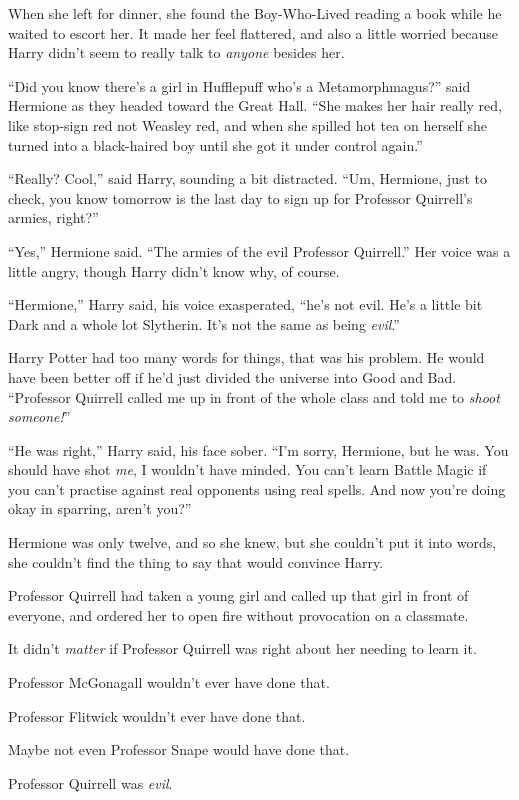 When she left for dinner, she found the Boy-Who-Lived reading a book while he waited to escort her. It made her feel flattered, and also a little worried because Harry didn’t seem to really talk to \emph{anyone} besides her.

“Did you know there’s a girl in Hufflepuff who’s a Metamorphmagus?” said Hermione as they headed toward the Great Hall. “She makes her hair really red, like stop-sign red not Weasley red, and when she spilled hot tea on herself she turned into a black-haired boy until she got it under control again.”

“Really? Cool,” said Harry, sounding a bit distracted. “Um, Hermione, just to check, you know tomorrow is the last day to sign up for Professor Quirrell’s armies, right?”

“Yes,” Hermione said. “The armies of the evil Professor Quirrell.” Her voice was a little angry, though Harry didn’t know why, of course.

“Hermione,” Harry said, his voice exasperated, “he’s not evil. He’s a little bit Dark and a whole lot Slytherin. It’s not the same as being \emph{evil}.”

Harry Potter had too many words for things, that was his problem. He would have been better off if he’d just divided the universe into Good and Bad. “Professor Quirrell called me up in front of the whole class and told me to \emph{shoot someone!}”

“He was right,” Harry said, his face sober. “I’m sorry, Hermione, but he was. You should have shot \emph{me}, I wouldn’t have minded. You can’t learn Battle Magic if you can’t practise against real opponents using real spells. And now you’re doing okay in sparring, aren’t you?”

Hermione was only twelve, and so she knew, but she couldn’t put it into words, she couldn’t find the thing to say that would convince Harry.

Professor Quirrell had taken a young girl and called up that girl in front of everyone, and ordered her to open fire without provocation on a classmate.

It didn’t \emph{matter} if Professor Quirrell was right about her needing to learn it.

Professor McGonagall wouldn’t ever have done that.

Professor Flitwick wouldn’t ever have done that.

Maybe not even Professor Snape would have done that.

Professor Quirrell was \emph{evil}.

